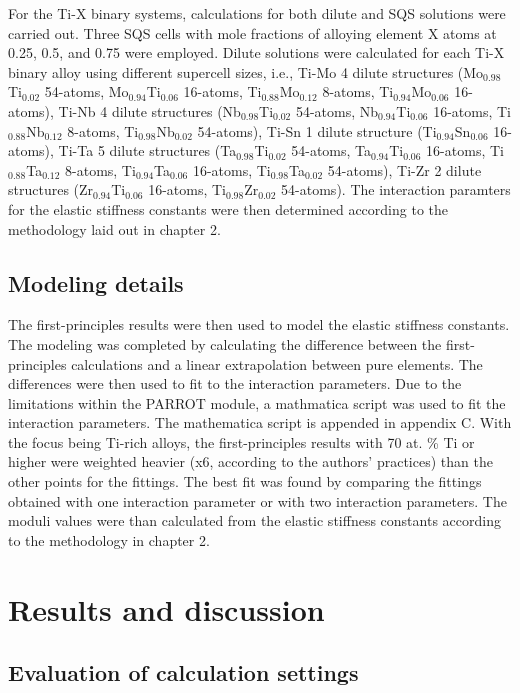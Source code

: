 For the Ti-X binary systems, calculations for both dilute and SQS solutions were carried out. Three SQS cells with mole fractions of alloying element X atoms at 0.25, 0.5, and 0.75 were employed. Dilute solutions were calculated for each Ti-X binary alloy using different supercell sizes, i.e., Ti-Mo 4 dilute structures (Mo$_{0.98}$Ti$_{0.02}$ 54-atoms, Mo$_{0.94}$Ti$_{0.06}$ 16-atoms, Ti$_{0.88}$Mo$_{0.12}$ 8-atoms, Ti$_{0.94}$Mo$_{0.06}$ 16-atoms), Ti-Nb 4 dilute structures (Nb$_{0.98}$Ti$_{0.02}$ 54-atoms, Nb$_{0.94}$Ti$_{0.06}$ 16-atoms, Ti$_{0.88}$Nb$_{0.12}$ 8-atoms, Ti$_{0.98}$Nb$_{0.02}$ 54-atoms), Ti-Sn 1 dilute structure (Ti$_{0.94}$Sn$_{0.06}$ 16-atoms), Ti-Ta 5 dilute structures (Ta$_{0.98}$Ti$_{0.02}$ 54-atoms, Ta$_{0.94}$Ti$_{0.06}$ 16-atoms, Ti$_{0.88}$Ta$_{0.12}$ 8-atoms, Ti$_{0.94}$Ta$_{0.06}$ 16-atoms, Ti$_{0.98}$Ta$_{0.02}$ 54-atoms), Ti-Zr 2 dilute structures (Zr$_{0.94}$Ti$_{0.06}$ 16-atoms, Ti$_{0.98}$Zr$_{0.02}$ 54-atoms). The interaction paramters for the  elastic stiffness constants were then determined according to the methodology laid out in chapter 2. 

\subsection{Modeling details}

The first-principles results were then used to model the elastic stiffness constants. The modeling was completed by calculating the difference between the first-principles calculations and a linear extrapolation between pure elements. The differences were then used to fit to the interaction parameters. Due to the limitations within the PARROT module, a mathmatica script was used to fit the interaction parameters. The mathematica script is appended in appendix C. With the focus being Ti-rich alloys, the first-principles results with 70 at. \% Ti or higher were weighted heavier (x6, according to the authors' practices) than the other points for the fittings. The best fit was found by comparing the fittings obtained with one interaction parameter or with two interaction parameters. The moduli values were than calculated from the elastic stiffness constants according to the methodology in chapter 2.

\section{Results and discussion}

\subsection{Evaluation of calculation settings}

